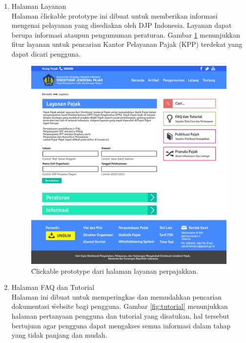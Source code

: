 \begin{enumerate}
\begin{figure}
		\end{figure}
	\item Halaman Layanan \\
	Halaman \f{clickable prototype} ini dibuat untuk memberikan informasi mengenai pelayanan yang disediakan oleh DJP Indonesia. Layanan dapat berupa informasi ataupun pengumuman peraturan. Gambar \ref{fig:layanan} menunjukkan fitur layanan untuk pencarian Kantor Pelayanan Pajak (KPP) terdekat yang dapat dicari pengguna.
		\begin{figure}
			\centering
			\includegraphics[width=\textwidth]
			{pics/layanan.jpg}
			\caption{\f{Clickable prototype} dari halaman layanan perpajakkan.}
			\label{fig:layanan}
		\end{figure}
	\item Halaman FAQ dan Tutorial \\
	Halaman ini dibuat untuk memperingkas dan memudahkan pencarian dokumentasi \f{website} bagi pengguna. Gambar \ref{fig:tutorial} menunjukkan halaman pertanyaan pengguna dan tutorial yang disatukan, hal tersebut bertujuan agar pengguna dapat mengakses semua informasi dalam tahap yang tidak panjang dan mudah.
		\begin{figure}
			\centering

\end{figure}
\end{enumerate}
